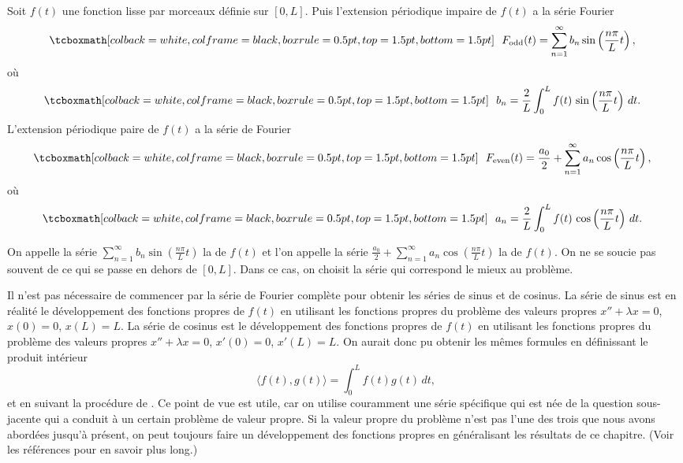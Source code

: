\begin{theorem}
Soit $f(t)$ une fonction lisse par morceaux définie sur $[0,L]$.
Puis l'extension périodique impaire
de $f(t)$ a la série Fourier
\begin{equation*}
\mybxbg{~~
F_{\text{odd}}(t) = \sum_{n=1}^\infty b_n \sin \left( \frac{n \pi}{L} t
\right) ,
~~}
\end{equation*}
où
\begin{equation*}
\mybxbg{~~
b_n = 
\frac{2}{L} \int_{0}^L f(t)\, \sin \left( \frac{n \pi}{L} t \right) \, dt .
~~}
\end{equation*}
L'extension périodique paire de $f (t)$ a la série de Fourier
\begin{equation*}
\mybxbg{~~
F_{\text{even}}(t) = \frac{a_0}{2} + \sum_{n=1}^\infty a_n \cos \left(
\frac{n \pi}{L} t \right) ,
~~}
\end{equation*}
où
\begin{equation*}
\mybxbg{~~
a_n = 
\frac{2}{L} \int_{0}^L f(t)\, \cos \left( \frac{n \pi}{L} t \right) \, dt .
~~}
\end{equation*}
\end{theorem}

On appelle la série $\sum_{n=1}^\infty b_n \sin \left( \frac{n \pi}{L} t\right)$ 
la \emph{} de  $f(t)$ et l'on appelle la série
$\frac{a_0}{2} + \sum_{n=1}^\infty a_n \cos \left( \frac{n \pi}{L} t
\right)$
la \emph{} de $f(t)$.  
On ne se soucie pas souvent de ce qui se passe en dehors de $ [0, L] $. Dans ce cas,
on choisit la série qui correspond le mieux au problème.

Il n'est pas nécessaire de commencer par la série de Fourier complète pour obtenir
les séries de sinus et de cosinus. La série de sinus est en réalité le développement des fonctions propres de $ f (t) $ en utilisant les
fonctions propres du problème des valeurs propres $x''+\lambda x = 0$, $x(0) = 0$,
$x(L) = L$.  La série de cosinus est le développement des fonctions propres de $ f (t) $
en utilisant les fonctions propres du problème des valeurs propres $x''+\lambda x = 0$, $x'(0) = 0$,
$x'(L) = L$.  On aurait donc pu obtenir les mêmes formules
en définissant le produit intérieur
\begin{equation*}
\langle f(t), g(t) \rangle = \int_0^L f(t) g(t) \, dt ,
\end{equation*}
et en suivant la procédure de .  Ce point de vue est
utile, car on utilise couramment une série spécifique qui est née de la question sous-jacente qui a
conduit à un certain problème de valeur propre. Si la valeur propre du
problème n'est pas l'une des trois que nous avons abordées jusqu'à présent, on peut toujours faire un
développement des fonctions propres en généralisant les résultats de ce chapitre. (Voir les références pour en savoir plus long.)

